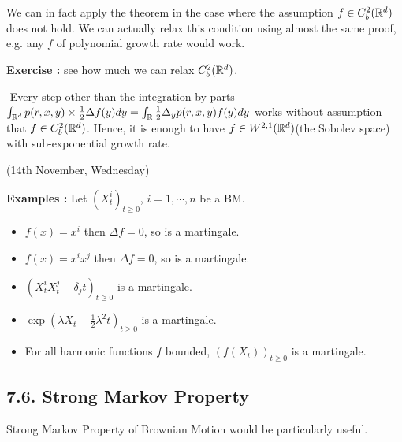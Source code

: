 \documentclass[12pt,a4paper]{report}
\newenvironment{proof}
{\begin{changemargin}{1cm}{0.5cm} 
	}%
	{\end{changemargin}
}
\begin{document}
We can in fact apply the theorem in the case where the assumption $f \in C_b^2(\mathbb{R}^d)$ does not hold. We can actually relax this condition using almost the same proof, e.g. any $f$ of polynomial growth rate would work.
\s

\textbf{Exercise :} see how much we can relax $C_b^2(\mathbb{R}^d)$.
\begin{proof}
-Every step other than the integration by parts $\int_{\mathbb{R}^d} p(r,x,y) \times \frac{1}{2} \Delta f(y) dy = \int_{\mathbb{R}} \frac{1}{2} \Delta_y p(r,x,y) f(y) dy$ works without assumption that $f\in C_b^2(\mathbb{R}^d)$. Hence, it is enough to have $f \in W^{2,1}(\mathbb{R}^d)$(the Sobolev space) with sub-exponential growth rate.
\end{proof}
\s

\newday

(14th November, Wednesday)
\s

\textbf{Examples : } Let $(X_t^i)_{t\geq 0}$, $i=1, \cdots, n$ be a BM.
\begin{itemize}
\item $f(x) = x^i$ then $\Delta f =0$, so is a martingale.
\item $f(x) = x^i x^j$ then $\Delta f=0$, so is a martingale.
\item $(X_t^i X_t^j - \delta_j t)_{t\geq 0}$ is a martingale.
\item $\exp(\lambda X_t - \frac{1}{2} \lambda^2 t)_{t\geq 0}$ is a martingale.
\item For all harmonic functions $f$ bounded, $(f(X_t))_{t\geq 0}$ is a martingale.
\end{itemize}

\subsection*{7.6. Strong Markov Property}

Strong Markov Property of Brownian Motion would be particularly useful.
\s
\end{document}
